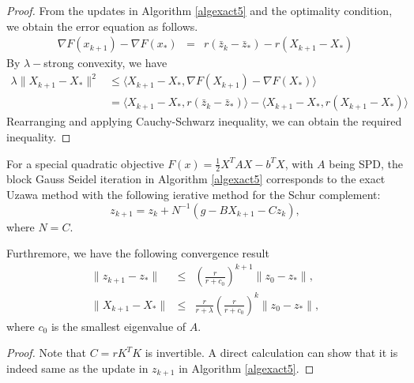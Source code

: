 \begin{itemize}
\begin{proof}
From the updates in Algorithm \ref{algexact5} and the optimality condition, we obtain the error equation as follows. 
\begin{eqnarray}
 \nabla F(x_{k+1}) - \nabla F(x_*) & = & r (\bar{z}_k - \bar{z}_*) - r(X_{k+1} - X_*)
\end{eqnarray}
By $\lambda-$strong convexity, we have 
\begin{equation*}
\begin{aligned}
    \lambda \|X_{k+1} - X_* \|^2 &\leq \langle X_{k+1} - X_*, \nabla F(X_{k+1}) - \nabla F(X_*) \rangle \\
    & = \langle X_{k+1} - X_*, r(\bar{z}_k - \bar{z}_* )\rangle - \langle X_{k+1} - X_*, r (X_{k+1} - X_*) \rangle 
\end{aligned} 
\end{equation*}
Rearranging and applying Cauchy-Schwarz inequality, we can obtain the required inequality. 
\end{proof}


\begin{theorem}
For a special quadratic objective $F(x) = \frac{1}{2} X^T A X - b^TX$, with $A$ being SPD, the block Gauss Seidel iteration in Algorithm \ref{algexact5} corresponds to the exact Uzawa method with the following ierative method for the Schur complement: 
\begin{equation}
    z_{k+1} = z_{k} + N^{-1} (g - B X_{k+1} - Cz_{k}),
\end{equation}
where $N = C$. 

Furthremore, we have the following convergence result
\begin{eqnarray}
     \| z_{k+1} - z_*\| &\leq& \left( \frac{r}{r +c_0}\right)^{k+1 } \| z_0 -z_*\|, \\
    \|X_{k+1} -X_* \| &\leq& \frac{r}{r + \lambda} \left( \frac{r}{r + c_0}\right)^k \|z_0 - z_* \|,
\end{eqnarray}
where $c_0$ is the smallest eigenvalue of $A$. 
\end{theorem}
\begin{proof}
Note that $C = rK^TK$ is invertible. A direct calculation can show that it is indeed same as the update in $z_{k+1}$ in Algorithm \ref{algexact5}. 


\end{proof}
\end{itemize}
